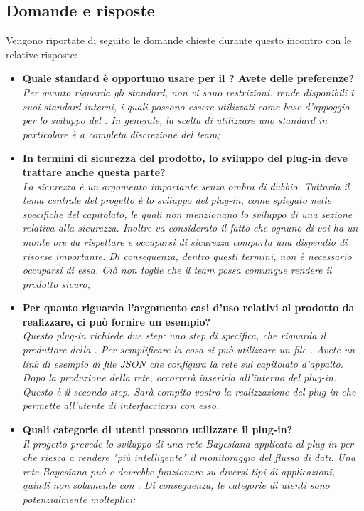 \subsection{Domande e risposte}
Vengono riportate di seguito le domande chieste durante questo incontro con le relative risposte: 
\begin{itemize}
\item\textbf{Quale standard è opportuno usare per il ? Avete delle preferenze?}\\
\emph{Per quanto riguarda gli standard, non vi sono restrizioni.   rende disponibili i suoi standard interni, i quali possono essere utilizzati come base d'appoggio per lo sviluppo del . In generale, la scelta di utilizzare uno standard in particolare è a completa discrezione del team;}

\item\textbf{In termini di sicurezza del prodotto, lo sviluppo del plug-in deve trattare anche questa parte?}\\
\emph{La sicurezza è un argomento importante senza ombra di dubbio. Tuttavia il tema centrale del progetto è lo sviluppo del plug-in, come spiegato nelle specifiche del capitolato, le quali non menzionano lo sviluppo di una sezione relativa alla sicurezza. Inoltre va considerato il fatto che ognuno di voi ha un monte ore da rispettare e occuparsi di sicurezza comporta una dispendio di risorse importante. Di conseguenza, dentro questi termini, non è necessario occuparsi di essa. Ciò non toglie che il team possa comunque rendere il prodotto sicuro;}

\item\textbf{Per quanto riguarda l'argomento casi d'uso relativi al prodotto da realizzare, ci può fornire un esempio?}\\
\emph{Questo plug-in richiede due step: uno step di specifica, che riguarda il produttore della . Per semplificare la cosa si può utilizzare un file . Avete un link di esempio di file JSON che configura la rete sul capitolato d'appalto.\\
Dopo la produzione della rete, occorrerà inserirla all'interno del plug-in. Questo è il secondo step. Sarà compito vostro la realizzazione del plug-in che permette all'utente di interfacciarsi con esso. }
\item\textbf{Quali categorie di utenti possono utilizzare il plug-in?} \\
\emph{Il progetto prevede lo sviluppo di una rete Bayesiana applicata al plug-in per  che riesca a rendere "più intelligente" il monitoraggio del flusso di dati. Una rete Bayesiana può e dovrebbe funzionare su diversi tipi di applicazioni, quindi non solamente con . Di conseguenza, le categorie di utenti sono potenzialmente molteplici;}


\end{itemize}
